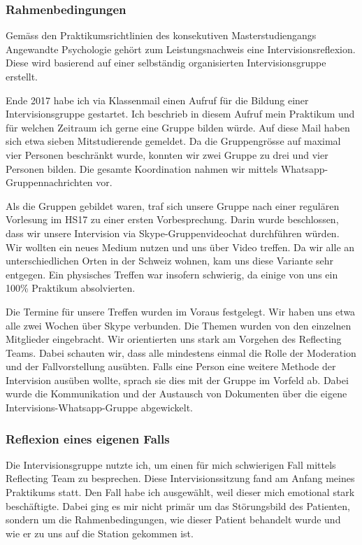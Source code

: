 \subsubsection{Rahmenbedingungen}
Gemäss den Praktikumsrichtlinien des konsekutiven Masterstudiengangs Angewandte Psychologie gehört zum Leistungsnachweis eine Intervisionsreflexion. Diese wird basierend auf einer selbständig organisierten Intervisionsgruppe erstellt. 

Ende 2017 habe ich via Klassenmail einen Aufruf für die Bildung einer Intervisionsgruppe gestartet. Ich beschrieb in diesem Aufruf mein Praktikum und für welchen Zeitraum ich gerne eine Gruppe bilden würde. Auf diese Mail haben sich etwa sieben Mitstudierende gemeldet. Da die Gruppengrösse auf maximal vier Personen beschränkt wurde, konnten wir zwei Gruppe zu drei und vier Personen bilden. Die gesamte Koordination nahmen wir mittels Whatsapp-Gruppennachrichten vor.

Als die Gruppen gebildet waren, traf sich unsere Gruppe nach einer regulären Vorlesung im HS17 zu einer ersten Vorbesprechung. Darin wurde beschlossen, dass wir unsere Intervision via Skype-Gruppenvideochat durchführen würden. Wir wollten ein neues Medium nutzen und uns über Video treffen. Da wir alle an unterschiedlichen Orten in der Schweiz wohnen, kam uns diese Variante sehr entgegen. Ein physisches Treffen war insofern schwierig, da einige von uns ein 100\% Praktikum absolvierten.

Die Termine für unsere Treffen wurden im Voraus festgelegt. Wir haben uns etwa alle zwei Wochen über Skype verbunden. Die Themen wurden von den einzelnen Mitglieder eingebracht. Wir orientierten uns stark am Vorgehen des Reflecting Teams. Dabei schauten wir, dass alle mindestens einmal die Rolle der Moderation und der Fallvorstellung ausübten. Falls eine Person eine weitere Methode der Intervision ausüben wollte, sprach sie dies mit der Gruppe im Vorfeld ab. Dabei wurde die Kommunikation und der Austausch von Dokumenten über die eigene Intervisions-Whatsapp-Gruppe abgewickelt.

\subsubsection{Reflexion eines eigenen Falls}
Die Intervisionsgruppe nutzte ich, um einen für mich  schwierigen Fall mittels Reflecting Team zu besprechen. Diese Intervisionssitzung fand am Anfang meines Praktikums statt. Den Fall habe ich ausgewählt, weil dieser mich emotional stark beschäftigte. Dabei ging es mir nicht primär um das Störungsbild des Patienten, sondern um die Rahmenbedingungen, wie dieser Patient behandelt wurde und wie er zu uns auf die Station gekommen ist. 

